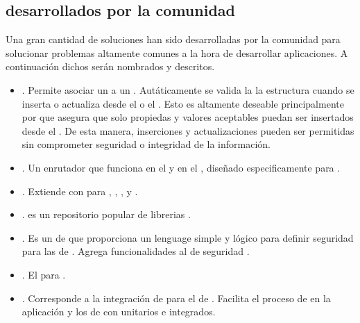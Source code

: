 \subsection{\packagesAS desarrollados por la comunidad}
Una gran cantidad de soluciones han sido desarrolladas por la comunidad para solucionar problemas altamente comunes a la hora de desarrollar aplicaciones. A continuación dichos \packagesAS serán nombrados y descritos.

	\begin{itemize}
		\item
			\textbf{\nameCollectionTwo}. Permite asociar un \schemaDB a un \mongoCollection. Autáticamente se valida la la estructura cuando se inserta o actualiza desde el \clientAS o el \serverAS. Esto es altamente deseable principalmente por que asegura que solo propiedas y valores aceptables puedan ser insertados desde el \clientAS. De esta manera, inserciones y actualizaciones \clientSideAS pueden ser permitidas sin comprometer seguridad o integridad de la información.
		\item
			\textbf{\nameRouter}. Un enrutador que funciona en el \serverAS y en el \browserINT, diseñado especificamente para \meteorNAME.
		\item
			\textbf{\nameCollectionHooks}. Extiende \mongoCollection con \hooksCPT \beforeAfterDB para \insertDB, \updateDB, \removeDB, \findDB y \findOneDB.
		\item
			\textbf{\nameBower}. \bowerIONAME es un repositorio popular de librerias \javaScriptNAME \clientSideAS.
		\item
			\textbf{\securityPackage}. Es un \packageAS de \meteorNAME que proporciona un lenguage \apiAS simple y lógico para definir seguridad para las \collectionsMETEOR de \mongodbNAME. Agrega funcionalidades al \coreAS de  seguridad \allowdenyCPT.
		\item
			\textbf{\velocityCorePackage}. El \testRunnerCPT \reactive para \meteorNAME.
		\item
			\textbf{\sanjoJasminePackage}. Corresponde a la integración de \meteorNAME \velocityNAME para el \frameworkPC de \testingCPT {}. Facilita el proceso de \testingCPT en la aplicación y los \packageAS de \meteorNAME con \testsCPT unitarios e integrados.

\end{itemize}
